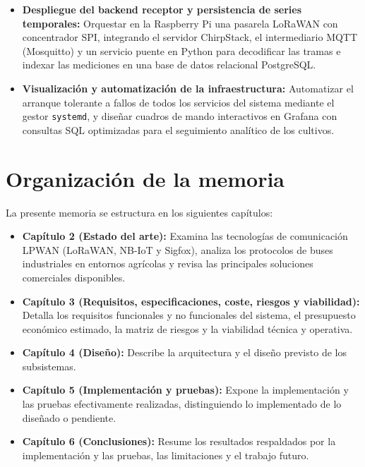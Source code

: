 \begin{itemize}
    \item \textbf{Despliegue del backend receptor y persistencia de series temporales:} Orquestar en la Raspberry Pi una pasarela LoRaWAN con concentrador SPI, integrando el servidor ChirpStack, el intermediario MQTT (Mosquitto) y un servicio puente en Python para decodificar las tramas e indexar las mediciones en una base de datos relacional PostgreSQL.

    \item \textbf{Visualización y automatización de la infraestructura:} Automatizar el arranque tolerante a fallos de todos los servicios del sistema mediante el gestor \texttt{systemd}, y diseñar cuadros de mando interactivos en Grafana con consultas SQL optimizadas para el seguimiento analítico de los cultivos.
\end{itemize}

\section{Organización de la memoria}
La presente memoria se estructura en los siguientes capítulos:
\begin{itemize}
    \item \textbf{Capítulo 2 (Estado del arte):} Examina las tecnologías de comunicación LPWAN (LoRaWAN, NB-IoT y Sigfox), analiza los protocolos de buses industriales en entornos agrícolas y revisa las principales soluciones comerciales disponibles.
    \item \textbf{Capítulo 3 (Requisitos, especificaciones, coste, riesgos y viabilidad):} Detalla los requisitos funcionales y no funcionales del sistema, el presupuesto económico estimado, la matriz de riesgos y la viabilidad técnica y operativa.
    \item \textbf{Capítulo 4 (Diseño):} Describe la arquitectura y el diseño previsto de los subsistemas.
    \item \textbf{Capítulo 5 (Implementación y pruebas):} Expone la implementación y las pruebas efectivamente realizadas, distinguiendo lo implementado de lo diseñado o pendiente.
    \item \textbf{Capítulo 6 (Conclusiones):} Resume los resultados respaldados por la implementación y las pruebas, las limitaciones y el trabajo futuro.
\end{itemize}